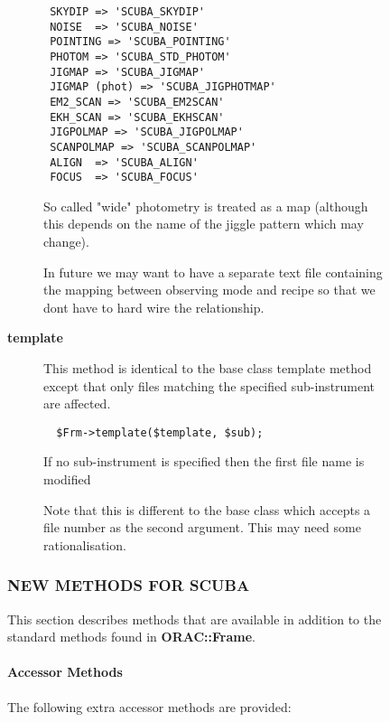 \begin{description}
\begin{description}
\begin{description}
\begin{verbatim}
 SKYDIP => 'SCUBA_SKYDIP'
 NOISE  => 'SCUBA_NOISE'
 POINTING => 'SCUBA_POINTING'
 PHOTOM => 'SCUBA_STD_PHOTOM'
 JIGMAP => 'SCUBA_JIGMAP'
 JIGMAP (phot) => 'SCUBA_JIGPHOTMAP'
 EM2_SCAN => 'SCUBA_EM2SCAN'
 EKH_SCAN => 'SCUBA_EKHSCAN'
 JIGPOLMAP => 'SCUBA_JIGPOLMAP'
 SCANPOLMAP => 'SCUBA_SCANPOLMAP'
 ALIGN  => 'SCUBA_ALIGN'
 FOCUS  => 'SCUBA_FOCUS'
\end{verbatim}


So called "wide" photometry is treated as a map (although this
depends on the name of the jiggle pattern which may change).



In future we may want to have a separate text file containing
the mapping between observing mode and recipe so that
we dont have to hard wire the relationship.


\item[{\textbf{template}}] \mbox{}

This method is identical to the base class template method
except that only files matching the specified sub-instrument
are affected.

\begin{verbatim}
  $Frm->template($template, $sub);
\end{verbatim}


If no sub-instrument is specified then the first file name
is modified



Note that this is different to the base class which accepts
a file number as the second argument. This may need some
rationalisation.

\end{description}
\subsubsection*{NEW METHODS FOR SCUBA\label{ORAC::Frame::SCUBA_NEW_METHODS_FOR_SCUBA}}


This section describes methods that are available in addition
to the standard methods found in \textbf{ORAC::Frame}.

\paragraph*{Accessor Methods\label{ORAC::Frame::SCUBA_Accessor_Methods}}


The following extra accessor methods are provided:


\end{description}
\end{description}
